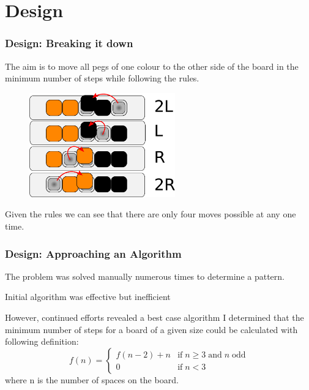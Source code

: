 \documentclass{beamer}
\begin{document}
\section{Design}
	\begin{frame}
		\frametitle{Design: Breaking it down}
		The aim is to move all pegs of one colour to the other side of the board in the minimum number of steps
		while following the rules.
		
		\begin{figure}
		\includegraphics[height=4.5cm]{pegboardmoves}
		\end{figure}
		
		Given the rules we can see that there are only four moves possible at any one time. 
		
		
	\end{frame}
	
	\begin{frame}
		\frametitle{Design: Approaching an Algorithm}
		The problem was solved manually numerous times to determine a pattern.
		\blt
			\item Initial algorithm was effective but inefficient
			\item However, continued efforts revealed a best case algorithm
		\finblt
		\vfill
		I determined that the minimum number of steps for a board of a given size could be calculated with following definition:
		\[
		f(n) = 
			\begin{cases} 
				f(n - 2) + n & \textrm{if}\; n \geq 3 \;\textrm{and}\; n \;\textrm{odd}\\
				0 & \textrm{if}\; n < 3
		 	\end{cases}
		\]
		where n is the number of spaces on the board.		
		
	\end{frame}
	
\end{document}
